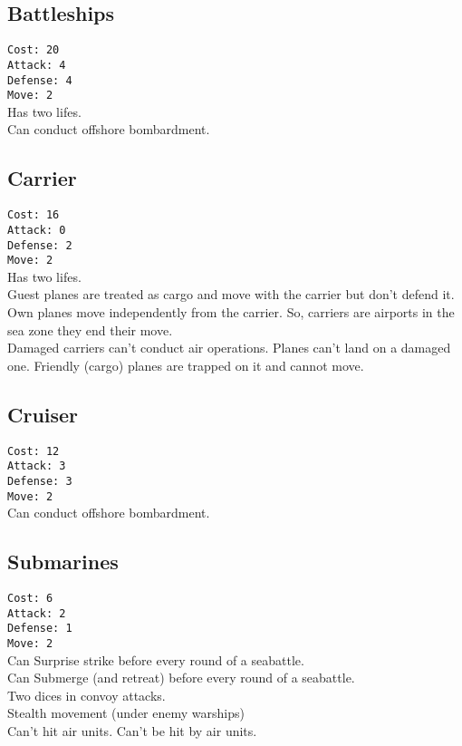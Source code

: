 \documentclass[10pt,twoside]{article}
\begin{document}
\begin{multicols*}{3}
\subsection*{Battleships}
\texttt{Cost: 20 \\ Attack: 4 \\ Defense: 4 \\ Move: 2}
\\
Has two lifes.\\
Can conduct offshore bombardment.

\subsection*{Carrier}
\texttt{Cost: 16 \\ Attack: 0 \\ Defense: 2 \\ Move: 2}
\\
Has two lifes.\\
Guest planes are treated as cargo and move with the carrier but don't defend it. Own planes move independently from the carrier. So, carriers are airports in the sea zone they end their move.\\
Damaged carriers can't conduct air operations. Planes can't land on a damaged one. Friendly (cargo) planes are trapped on it and cannot move.

\subsection*{Cruiser}
\texttt{Cost: 12 \\ Attack: 3 \\ Defense: 3 \\ Move: 2}
\\
Can conduct offshore bombardment.

\subsection*{Submarines}
\texttt{Cost: 6 \\ Attack: 2 \\ Defense: 1 \\ Move: 2}
\\
Can Surprise strike before every round of a seabattle.\\
Can Submerge (and retreat) before every round of a seabattle.\\
Two dices in convoy attacks.\\
Stealth movement (under enemy warships)\\
Can't hit air units. Can't be hit by air units.


\end{multicols*}
\end{document}
